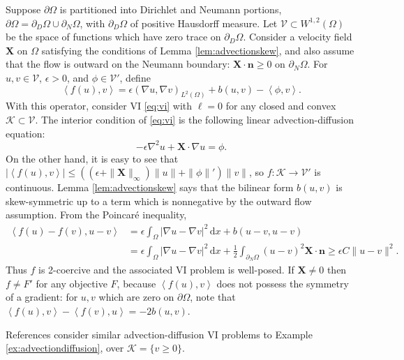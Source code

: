 \documentclass[review,hidelinks,onefignum,onetabnum,final]{siamart220329}  %
\newcommand{\eps}{\epsilon}
\newcommand{\grad}{\nabla}
\newcommand{\bn}{\mathbf{n}}
\newcommand{\bX}{\mathbf{X}}
\newcommand{\cK}{\mathcal{K}}
\newcommand{\cV}{\mathcal{V}}
\newcommand{\ip}[2]{\left<#1,#2\right>}
\newcommand{\dx}{\, \mathrm{d}x}
\begin{document}
\begin{example}  \label{ex:advectiondiffusion}  Suppose $\partial\Omega$ is partitioned into Dirichlet and Neumann portions, $\partial\Omega = \partial_D\Omega \cup \partial_N\Omega$, with $\partial_D\Omega$ of positive Hausdorff measure.  Let $\cV \subset W^{1,2}(\Omega)$ be the space of functions which have zero trace on $\partial_D\Omega$.  Consider a velocity field $\bX$ on $\Omega$ satisfying the conditions of Lemma \ref{lem:advectionskew}, and also assume that the flow is outward on the Neumann boundary: $\bX \cdot \bn \ge 0$ on $\partial_N\Omega$.  For $u,v \in \cV$, $\eps>0$, and $\phi \in \cV'$, define
\begin{equation}
\ip{f(u)}{v} = \eps \left(\grad u, \grad v\right)_{L^2(\Omega)} + b(u,v) - \ip{\phi}{v}. \label{eq:advectiondiffusion}
\end{equation}
With this operator, consider VI \eqref{eq:vi} with $\ell = 0$ for any closed and convex $\cK \subset \cV$. The interior condition \cite{KinderlehrerStampacchia1980} of \eqref{eq:vi} is the following linear advection-diffusion equation:
\begin{equation}
-\eps \grad^2 u + \bX\cdot \grad u = \phi.
\label{eq:advectiondiffusionstrong}
\end{equation}
On the other hand, it is easy to see that $|\!\ip{f(u)}{v}\!| \le \left((\eps + \|\bX\|_\infty) \|u\| + \|\phi\|'\right) \|v\|$, so $f:\cK \to \cV'$ is continuous.  Lemma \ref{lem:advectionskew} says that the bilinear form $b(u,v)$ is skew-symmetric up to a term which is nonnegative by the outward flow assumption.  From the Poincar\'e inequality,
\begin{align*}
\ip{f(u)-f(v)}{u-v} &= \eps \int_\Omega |\grad u - \grad v|^2\dx + b(u-v,u-v) \\
                    &= \eps \int_\Omega |\grad u - \grad v|^2\dx + \frac{1}{2} \int_{\partial_N\Omega} (u-v)^2 \bX\cdot\bn \ge \eps C \|u-v\|^2.
\end{align*}
Thus $f$ is 2-coercive and the associated VI problem is well-posed. If $\bX \ne 0$ then $f\ne F'$ for any objective $F$, because $\ip{f(u)}{v}$ does not possess the symmetry of a gradient: for $u,v$ which are zero on $\partial \Omega$, note that $\ip{f(u)}{v} - \ip{f(v)}{u} = -2 b(u,v)$.\end{example}

References \cite{Bueler2021conservation,ChangNakshatrala2017} consider similar advection-diffusion VI problems to Example \ref{ex:advectiondiffusion}, over $\cK = \{v\ge 0\}$.
\end{document}

